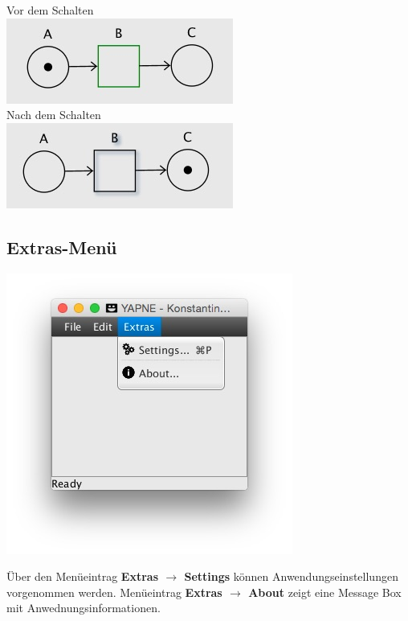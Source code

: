 \documentclass[12pt]{article}
\begin{document}
\begin{itemize}
Vor dem Schalten \\
\includegraphics[scale=0.5]{trans_before} \\
Nach dem Schalten \\
\includegraphics[scale=0.5]{trans_after}
\end{itemize}



\subsection{Extras-Menü} 

\includegraphics{menu_extras}

Über den Menüeintrag \textbf{Extras $\rightarrow$ Settings} können Anwendungseinstellungen vorgenommen werden. Menüeintrag \textbf{Extras $\rightarrow$ About} zeigt eine Message Box mit Anwednungsinformationen.
\end{document}
